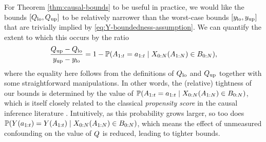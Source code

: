 For Theorem \ref{thm:causal-bounds} to be useful in practice, we would like the bounds $[Q_{\mathrm{lo}}, Q_{\mathrm{up}}]$ to be relatively narrower than the worst-case bounds $[y_{\mathrm{lo}}, y_{\mathrm{up}}]$ that are trivially implied by \eqref{eq:Y-boundedness-assumption}.
We can quantify the extent to which this occurs by the ratio
\begin{equation} \label{eq:tightness-of-bounds-measure}
    \frac{Q_{\mathrm{up}} - Q_{\mathrm{lo}}}{y_{\mathrm{up}} - y_{\mathrm{lo}}} = 1 - \mathbb{P}(A_{1:t} = a_{1:t} \mid X_{0:N}(A_{1:N}) \in B_{0:N}),
\end{equation}
where the equality here follows from the definitions of $Q_{\mathrm{lo}}$ and $Q_{\mathrm{up}}$ together with some straightforward manipulations.
In other words, the (relative) tightness of our bounds is determined by the value of $\mathbb{P}(A_{1:t} = a_{1:t} \mid X_{0:N}(A_{1:N}) \in B_{0:N})$, which is itself closely related to the classical \emph{propensity score} in the causal inference literature \citep{rosenbaum1983central}. %
Intuitively, as this probability grows larger, so too does $\mathbb{P}(Y(a_{1:t}) = Y(A_{1:t}) \mid X_{0:N}(A_{1:N}) \in B_{0:N})$, which means the effect of unmeasured confounding on the value of $Q$ is reduced, leading to tighter bounds.

